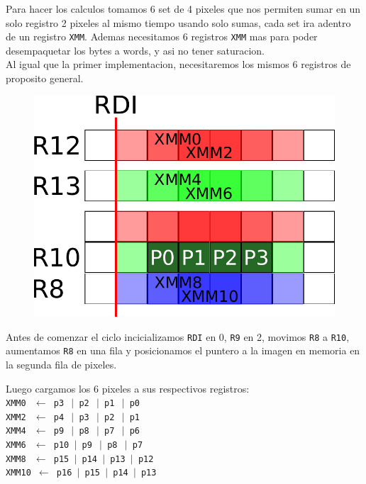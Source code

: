 Para hacer los calculos tomamos 6 set de 4 pixeles que nos permiten sumar en un solo registro 2 pixeles al mismo tiempo usando solo sumas, cada set ira adentro de un registro \texttt{XMM}. Ademas necesitamos 6 registros \texttt{XMM} mas para poder desempaquetar los bytes a words, y asi no tener saturacion. \\

\newpage
Al igual que la primer implementacion, necesitaremos los mismos 6 registros de proposito general. \\

\begin{figure}[h!]
	\centering
	\includegraphics[scale=0.5]{images/BlurASM2_0}
\end{figure}

Antes de comenzar el ciclo incicializamos \texttt{RDI} en 0, \texttt{R9} en 2, movimos \texttt{R8} a \texttt{R10}, aumentamos \texttt{R8} en una fila y posicionamos el puntero a la imagen en memoria en la segunda fila de pixeles.

Luego cargamos los 6 pixeles a sus respectivos registros:\\

\noindent
\texttt{XMM0 $\ \gets$ p3 $\ \vert$ p2 $\ \vert$ p1 $\ \vert$ p0} \\
\texttt{XMM2 $\ \gets$ p4 $\ \vert$ p3 $\ \vert$ p2 $\ \vert$ p1} \\
\texttt{XMM4 $\ \gets$ p9 $\ \vert$ p8 $\ \vert$ p7 $\ \vert$ p6} \\
\texttt{XMM6 $\ \gets$ p10 $\vert$ p9 $\ \vert$ p8 $\ \vert$ p7} \\
\texttt{XMM8 $\ \gets$ p15 $\vert$ p14 $\vert$ p13 $\vert$ p12} \\
\texttt{XMM10 $\gets$ p16 $\vert$ p15 $\vert$ p14 $\vert$ p13} \\


